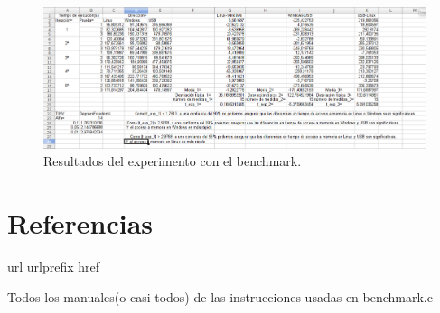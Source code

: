 \documentclass[paper=a4, fontsize=11pt]{scrartcl} %
\numberwithin{equation}{section} %
\numberwithin{figure}{section} %
\numberwithin{table}{section} %
\begin{document}
		 \begin{figure}[H]
 			\centering
			\includegraphics[width=15cm]{Resultados.jpg}
 			\caption{Resultados del experimento con el benchmark.}
 			\label{fig:benchmark}	
 		\end{figure}

		\cite{man_benchmark}

\newpage
\section{Referencias}
\begin{thebibliography}{10}
\expandafter\ifx\csname url\endcsname\relax
  \def\url#1{\texttt{#1}}\fi
\expandafter\ifx\csname urlprefix\endcsname\relax\def\urlprefix{URL}\fi
\expandafter\ifx\csname href\endcsname\relax
  \def\href#1#2{#2} \def\path#1{#1}\fi

Todos los manuales(o casi todos) de las instrucciones usadas en benchmark.c

\end{thebibliography}
\end{document}
